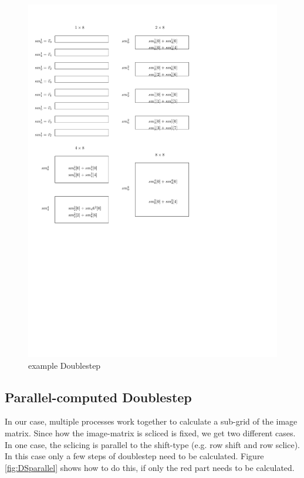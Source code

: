 \documentclass[12pt]{article}
\begin{document}
\begin{figure}[h!]
\includegraphics[scale=0.7]{Doublestep_overview}
\caption{example Doublestep}
\label{fig:DS}
\end{figure}

\subsection{ Parallel-computed Doublestep }

In our case, multiple processes work together to calculate a sub-grid of the image matrix. Since how the image-matrix is scliced is fixed, we get two different cases. In one case, the sclicing is parallel to the shift-type (e.g. row shift and row sclice). In this case only a few steps of doublestep need to be calculated. Figure \ref{fig:DSparallel} shows how to do this, if only the red part needs to be calculated. \\
\end{document}
